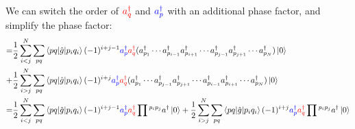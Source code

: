 \documentclass{article}
\newcommand{\dg}{\ensuremath{^\dagger} }
\newcommand{\cd}{\ensuremath{\cdots} }
\begin{document}
We can switch the order of ${\color{red} a\dg_{q}}$ and  ${\color{blue} a\dg_{p}}$ with an additional phase factor, and simplify the phase factor:
\begin{align*}
= &\frac{1}{2} \sum\limits_{i < j} ^N   \sum_{pq}  \braket{pq | \hat{g} | p_i q_i } (-1)^{i + j - 1}  {\color{blue}  a\dg_{p}}  {\color{red} a\dg_{q}} (a\dg_{p_1} \cd a\dg_{p_{i - 1}}  a\dg_{p_{i +1}} \cd  a\dg_{p_{j - 1}} a\dg_{p_{j +1}} \cd a\dg_{p_N}) \ket{0}  \\
+ &\frac{1}{2} \sum\limits_{i > j} ^N   \sum_{pq}  \braket{pq | \hat{g} | p_i q_i } (-1)^{i + j}   {\color{blue} a\dg_{p}}  {\color{red} a\dg_{q}}  (a\dg_{p_1} \cd a\dg_{p_{j - 1}} a\dg_{p_{j +1}} \cd  a\dg_{p_{i - 1}}a\dg_{p_{i +1}} \cd a\dg_{p_N})  \ket{0}  \\
= &\frac{1}{2} \sum\limits_{i < j} ^N   \sum_{pq}  \braket{pq | \hat{g} | p_i q_i } (-1)^{i + j - 1}  {\color{blue}  a\dg_{p}}  {\color{red} a\dg_{q}} \prod{}^{p_ip_j}a\dg \ket{0} 
 + \frac{1}{2} \sum\limits_{i > j} ^N   \sum_{pq}  \braket{pq | \hat{g} | p_i q_i } (-1)^{i + j}   {\color{blue} a\dg_{p}}  {\color{red} a\dg_{q}} \prod{}^{p_ip_j}a\dg \ket{0}  \\
\end{align*}
\end{document}
